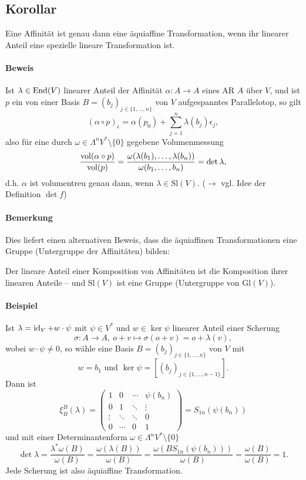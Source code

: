 \subsection{Korollar}
	Eine Affinität ist genau dann eine äquiaffine Transformation, wenn ihr linearer Anteil eine spezielle lineare Transformation ist.
\paragraph{Beweis}
	Ist $ \lambda \in \operatorname{End}(V) $ linearer Anteil der Affinität $ \alpha:A\to A $ eines AR $ A  $ über $ V $, und ist $ p $ ein von einer Basis $ B=(b_j)_{j\in \{1,\dots,n\}} $ von $ V $ aufgespanntes Parallelotop, so gilt
		\[ (\alpha\circ p)_\epsilon = \alpha(p_0)+\sum_{j=1}^{n}\lambda(b_j)\epsilon_j, \]
	also für eine durch $ \omega\in \Lambda^nV^*\setminus \{0\} $ gegebene Volumenmessung
		\[ \frac{\operatorname{vol}(\alpha\circ p)}{\operatorname{vol}(p)} = \frac{\omega(\lambda(b_1),\dots,\lambda(b_n))}{\omega(b_1,\dots,b_n)}=\det \lambda, \]
	d.h. $ \alpha $ ist volumentreu genau dann, wenn $ \lambda \in \mathrm{Sl}(V) $. ($ \rightarrow $ vgl. Idee der Definition $ \det f $)
\paragraph{Bemerkung}
	Dies liefert einen alternativen Beweis, dass die äquiaffinen Transformationen eine Gruppe (Untergruppe der Affinitäten) bilden:
	
	Der lineare Anteil einer Komposition von Affinitäten ist die Komposition ihrer linearen Anteile -- und $ \mathrm{Sl}(V) $ ist eine Gruppe (Untergruppe von $ \mathrm{Gl}(V) $).
\paragraph{Beispiel}
	Ist $ \lambda = \operatorname{id}_V + w\cdot \psi $ mit $ \psi\in V^* $ und $ w\in \ker \psi $ linearer Anteil einer Scherung
		\[ \sigma:A\to A,\ o+v\mapsto \sigma(o+v) = o+\lambda(v), \]
	wobei $ w\cdot\psi\neq 0 $, so wähle eine Basis $ B = (b_j)_{j\in\{1,\dots,n\}}$ von $ V $ mit
		\[ w=b_1 \text{ und }  \ker \psi = [(b_j)_{j\in \{1,\dots,n-1\}}]. \]
	Dann ist
		\[ \xi_B^B(\lambda) =
			\begin{pmatrix}
				1 & 0 & \cdots & \psi(b_n)\\
				0 & 1 & \ddots & \vdots \\
				\vdots &\ddots & \ddots & 0\\
				0 &\cdots& 0 & 1
			\end{pmatrix} = S_{1n}(\psi(b_n)) \]
	und mit einer Determinantenform $ \omega\in \Lambda^nV^*\setminus\{0\} $
		\[ \det \lambda = \frac{\lambda^*\omega(B)}{\omega(B)} = \frac{\omega(\lambda(B))}{\omega(B)} = \frac{\omega(BS_{1n}(\psi(b_n)))}{\omega(B)} = \frac{\omega(B)}{\omega(B)} = 1.\]
	Jede Scherung ist also äquiaffine Transformation.
    
